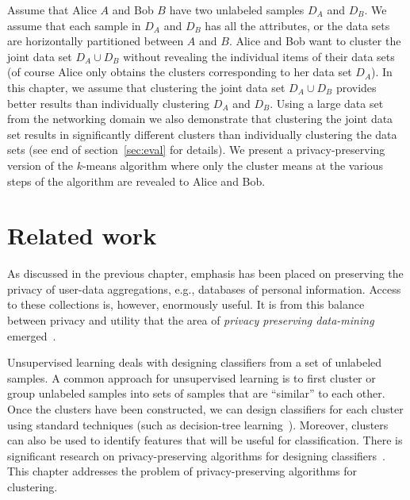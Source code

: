 Assume that Alice $A$ and Bob $B$ have two unlabeled samples $D_A$ and
$D_B$. We assume that each sample in $D_A$ and $D_B$ has all the
attributes, or the data sets are horizontally partitioned between $A$
and $B$. Alice and Bob want to cluster the joint data set $D_A \cup
D_B$ without revealing the individual items of their data sets (of
course Alice only obtains the clusters corresponding to her data set
$D_A$). In this chapter, we assume that clustering the joint data set
$D_A \cup D_B$ provides better results than individually clustering
$D_A$ and $D_B$.  Using a large data set from the networking domain we also demonstrate
that clustering the joint data set results in significantly different
clusters than individually clustering the data sets (see end of
section~\ref{sec:eval} for details). We present a privacy-preserving
version of the $k$-means algorithm where only the cluster means at the
various steps of the algorithm are revealed to Alice and Bob.



\section{Related work}

As discussed in the previous chapter,
emphasis has been placed on preserving the
privacy of user-data aggregations, e.g., databases of personal
information.  Access to these  collections is, however, enormously
useful.  It is from this balance between privacy and utility that the
area of {\it privacy preserving data-mining}
emerged~\cite{Agrawal-Srikant,Lindell-Pinkas}.



Unsupervised learning deals with designing classifiers from a set of
unlabeled samples. A common approach for unsupervised learning is to
first cluster or group unlabeled samples into sets of samples that are
``similar'' to each other. Once the clusters have been constructed, we
can design classifiers for each cluster using standard techniques
(such as decision-tree
learning~\cite{Mitchell:AI,Quinlan:86}). Moreover, clusters can also
be used to identify features that will be useful for
classification. There is significant research on privacy-preserving
algorithms for designing
classifiers~\cite{Agrawal-Srikant,Lindell-Pinkas}. This chapter
addresses the problem of privacy-preserving algorithms for clustering.



